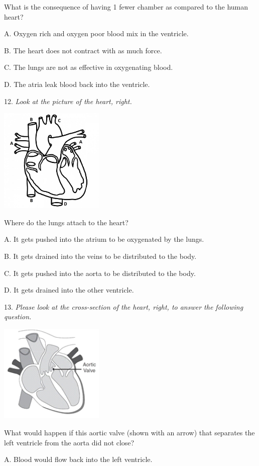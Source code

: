 \documentclass[11.5pt]{sig-alternate} %
\begin{document}
What is the consequence of having 1 fewer chamber as compared to the human heart?

A. Oxygen rich and oxygen poor blood mix in the ventricle.

B. The heart does not contract with as much force.

C. The lungs are not as effective in oxygenating blood.

D. The atria leak blood back into the ventricle.

12. \textit{Look at the picture of the heart, right.}

\includegraphics[width=5cm]{quiz/heart12.jpg}

Where do the lungs attach to the heart?

A. It gets pushed into the atrium to be oxygenated by the lungs.

B. It gets drained into the veins to be distributed to the body.

C. It gets pushed into the aorta to be distributed to the body.

D. It gets drained into the other ventricle.

13. \textit{Please look at the cross-section of the heart, right, to answer the following question.}

\includegraphics[width=5cm]{quiz/heart13.png}

What would happen if this aortic valve (shown with an arrow) that separates the left ventricle from the aorta did not close?

A. Blood would flow back into the left ventricle.
\end{document}
